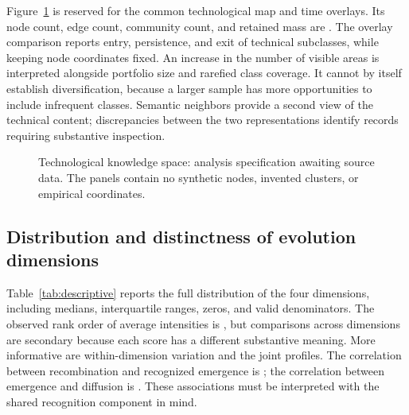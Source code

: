 Figure~\ref{fig:map} is reserved for the common technological map and time overlays.
Its node count, edge count, community count, and retained mass are
. The overlay comparison reports entry, persistence,
and exit of technical subclasses, while keeping node coordinates fixed. An increase
in the number of visible areas is interpreted alongside portfolio size and rarefied
class coverage. It cannot by itself establish diversification, because a larger
sample has more opportunities to include infrequent classes. Semantic neighbors
provide a second view of the technical content; discrepancies between the two
representations identify records requiring substantive inspection.

\begin{figure}[tbp]\centering
{}
\hfill
{}
\caption{Technological knowledge space: analysis specification awaiting source data. The panels contain no synthetic nodes, invented clusters, or empirical coordinates.}
\label{fig:map}
\end{figure}


\subsection{Distribution and distinctness of evolution dimensions}
Table~\ref{tab:descriptive} reports the full distribution of the four dimensions,
including medians, interquartile ranges, zeros, and valid denominators. The observed
rank order of average intensities is , but comparisons across
dimensions are secondary because each score has a different substantive meaning.
More informative are within-dimension variation and the joint profiles. The
correlation between recombination and recognized emergence is
; the correlation between emergence
and diffusion is . These associations
must be interpreted with the shared recognition component in mind.

